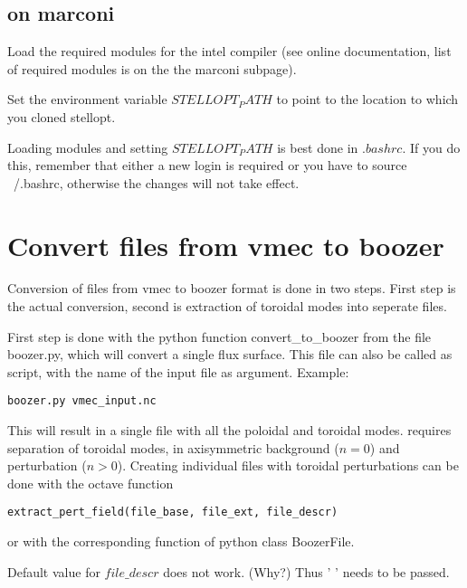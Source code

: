 \documentclass{article}
\begin{document}
\subsection{on marconi}
Load the required modules for the intel compiler (see online
documentation, list of required modules is on the the marconi subpage).

Set the environment variable $STELLOPT_PATH$ to point to the location to
which you cloned stellopt.

Loading modules and setting $STELLOPT_PATH$ is best done in $.bashrc$.
If you do this, remember that either a new login is required or you have
to source ~/.bashrc, otherwise the changes will not take effect.


\section{Convert files from vmec to boozer}
Conversion of files from vmec to boozer format is done in two steps.
First step is the actual conversion, second is extraction of toroidal
modes into seperate files.

First step is done with the python function convert_to_boozer
from the file boozer.py, which will convert a single flux surface.
This file can also be called as script, with the name of the input file
as argument. Example:
\begin{verbatim}
boozer.py vmec_input.nc
\end{verbatim}
This will result in a single file with all the poloidal and toroidal
modes. \neotwo requires separation of toroidal modes, in axisymmetric
background ($n = 0$) and perturbation ($n > 0$).
Creating individual files  with toroidal perturbations can be done with
the octave function
\begin{verbatim}
extract_pert_field(file_base, file_ext, file_descr)
\end{verbatim}
or with the corresponding function of python class BoozerFile.

Default value for $file\_descr$ does not work. (Why?) Thus ' ' needs to
be passed.
\end{document}

